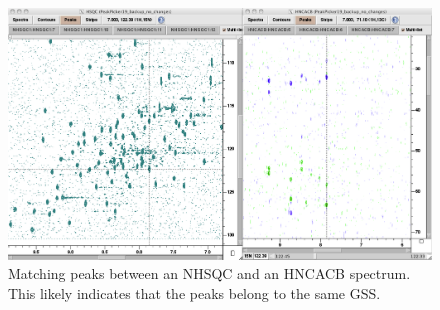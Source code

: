 \begin{figure}
  \includegraphics[scale=0.3]{figures/nhsqc_hncacb}
  \caption[Matching peaks between an NHSQC and an HNCACB spectrum.]
          {Matching peaks between an NHSQC and an HNCACB spectrum.
           This likely indicates that the peaks belong to the same GSS.}
  \label{nhsqc_hncacb}
\end{figure}

